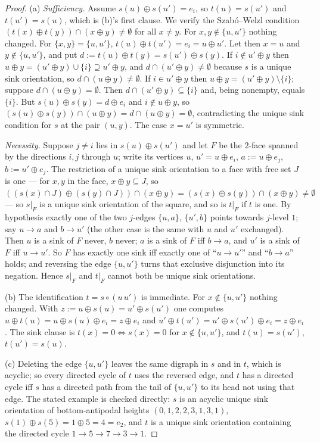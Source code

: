 \begin{proof}
(a) \emph{Sufficiency.} Assume $s(u)\oplus s(u')=e_i$, so $t(u)=s(u')$ and
$t(u')=s(u)$, which is (b)'s first clause. We verify the Szab\'o--Welzl
condition $(t(x)\oplus t(y))\cap(x\oplus y)\ne\emptyset$ for all $x\ne y$.
For $x,y\notin\{u,u'\}$ nothing changed. For $\{x,y\}=\{u,u'\}$,
$t(u)\oplus t(u')=e_i=u\oplus u'$. Let then $x=u$ and $y\notin\{u,u'\}$, and
put $d:=t(u)\oplus t(y)=s(u')\oplus s(y)$. If $i\notin u'\oplus y$ then
$u\oplus y=(u'\oplus y)\cup\{i\}\supseteq u'\oplus y$, and
$d\cap(u'\oplus y)\ne\emptyset$ because $s$ is a unique sink orientation, so
$d\cap(u\oplus y)\ne\emptyset$. If $i\in u'\oplus y$ then
$u\oplus y=(u'\oplus y)\setminus\{i\}$; suppose $d\cap(u\oplus y)=\emptyset$.
Then $d\cap(u'\oplus y)\subseteq\{i\}$ and, being nonempty, equals $\{i\}$.
But $s(u)\oplus s(y)=d\oplus e_i$ and $i\notin u\oplus y$, so
$(s(u)\oplus s(y))\cap(u\oplus y)=d\cap(u\oplus y)=\emptyset$, contradicting
the unique sink condition for $s$ at the pair $(u,y)$. The case $x=u'$ is
symmetric.

\emph{Necessity.} Suppose $j\ne i$ lies in $s(u)\oplus s(u')$ and let $F$ be
the $2$-face spanned by the directions $i,j$ through $u$; write its vertices
$u$, $u'=u\oplus e_i$, $a:=u\oplus e_j$, $b:=u'\oplus e_j$. The restriction
of a unique sink orientation to a face with free set $J$ is one --- for
$x,y$ in the face, $x\oplus y\subseteq J$, so
$((s(x)\cap J)\oplus(s(y)\cap J))\cap(x\oplus y)=(s(x)\oplus s(y))\cap(x\oplus y)\ne\emptyset$
--- so $s|_F$ is a unique sink orientation of the square, and so is $t|_F$ if
$t$ is one. By hypothesis
exactly one of the two $j$-edges $\{u,a\}$, $\{u',b\}$ points towards
$j$-level $1$; say $u\to a$ and $b\to u'$ (the other case is the same with
$u$ and $u'$ exchanged). Then $u$ is a sink of $F$ never, $b$ never; $a$ is a
sink of $F$ iff $b\to a$, and $u'$ is a sink of $F$ iff $u\to u'$. So $F$ has
exactly one sink iff exactly one of ``$u\to u'$'' and ``$b\to a$'' holds; and
reversing the edge $\{u,u'\}$ turns that exclusive disjunction into its
negation. Hence $s|_F$ and $t|_F$ cannot both be unique sink orientations.

(b) The identification $t=s\circ(u\,u')$ is immediate. For $x\notin\{u,u'\}$
nothing changed. With $z:=u\oplus s(u)=u'\oplus s(u')$ one computes
$u\oplus t(u)=u\oplus s(u)\oplus e_i=z\oplus e_i$ and
$u'\oplus t(u')=u'\oplus s(u')\oplus e_i=z\oplus e_i$. The sink clause is
$t(x)=0\Leftrightarrow s(x)=0$ for $x\notin\{u,u'\}$, and
$t(u)=s(u')$, $t(u')=s(u)$.

(c) Deleting the edge $\{u,u'\}$ leaves the same digraph in $s$ and in $t$,
which is acyclic; so every directed cycle of $t$ uses the reversed edge, and
$t$ has a directed cycle iff $s$ has a directed path from the tail of
$\{u,u'\}$ to its head not using that edge. The stated example is checked
directly: $s$ is an acyclic unique sink orientation of bottom-antipodal
heights $(0,1,2,2,3,1,3,1)$, $s(1)\oplus s(5)=1\oplus5=4=e_2$, and $t$ is a
unique sink orientation containing the directed cycle $1\to5\to7\to3\to1$.
\end{proof}

